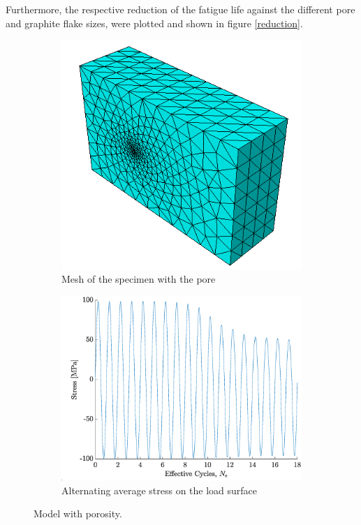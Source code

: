 \documentclass[11pt,a4paper]{article}
\begin{document}
\noindent Furthermore, the respective reduction of the fatigue life against the different pore and graphite flake sizes, were plotted and shown in figure \ref{reduction}.

\begin{figure} [ht]
\begin{subfigure}{0.5\textwidth}
\hspace{-8mm}
\includegraphics[scale=0.52, center]{01mm_mesh.png}
\vspace{20mm}
\caption{Mesh of the specimen with the pore}
\label{pore specimen}
\end{subfigure}
\begin{subfigure}{0.5\textwidth}
\includegraphics[scale=0.37, center]{stress_porosity.eps}
\caption{Alternating average stress on the load surface}
\label{pore alternating}
\end{subfigure}
\caption{Model with porosity.}
\end{figure}
\end{document}
